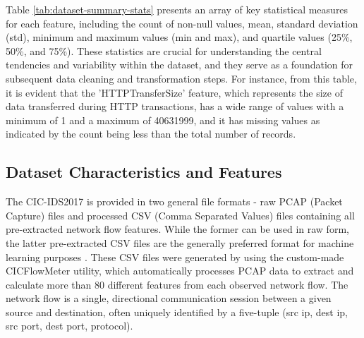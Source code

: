 Table \ref{tab:dataset-summary-stats} presents an array of key statistical measures for each feature, including the count of non-null values, mean, standard deviation (std), minimum and maximum values (min and max), and quartile values (25\%, 50\%, and 75\%). These statistics are crucial for understanding the central tendencies and variability within the dataset, and they serve as a foundation for subsequent data cleaning and transformation steps. For instance, from this table, it is evident that the 'HTTPTransferSize' feature, which represents the size of data transferred during HTTP transactions, has a wide range of values with a minimum of 1 and a maximum of 40631999, and it has missing values as indicated by the count being less than the total number of records.


\subsection{Dataset Characteristics and Features}\label{subsec:feature-dist}
The CIC-IDS2017 is provided in two general file formats - raw PCAP (Packet Capture) files and processed CSV (Comma Separated Values) files containing all pre-extracted network flow features. While the former can be used in raw form, the latter pre-extracted CSV files are the generally preferred format for machine learning purposes \parencite {sharafaldin2018toward}. These CSV files were generated by using the custom-made CICFlowMeter utility, which automatically processes PCAP data to extract and calculate more than 80 different features from each observed network flow. The network flow is a single, directional communication session between a given source and destination, often uniquely identified by a five-tuple (src ip, dest ip, src port, dest port, protocol).


